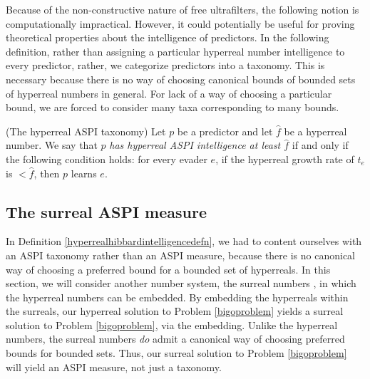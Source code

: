 \documentclass[twoside,11pt]{article}
\begin{document}
Because of the non-constructive nature of free ultrafilters, the following notion
is computationally impractical. However, it could potentially be useful for
proving theoretical properties about the intelligence of predictors. In the following
definition, rather than assigning a particular hyperreal number intelligence to every
predictor, rather, we categorize predictors into a taxonomy.
This is necessary because there is no way of choosing canonical bounds
of bounded sets of hyperreal numbers in general. For lack of a way of
choosing a particular bound, we are forced to consider many taxa corresponding
to many bounds.

\begin{definition}
\label{hyperrealhibbardintelligencedefn}
    (The hyperreal ASPI taxonomy)
    Let $p$ be a predictor and let $\hat f$ be a hyperreal number.
    We say that $p$ \emph{has hyperreal ASPI intelligence at least $\hat f$}
    if and only if the following condition holds:
    for every evader $e$, if the hyperreal growth rate of $t_e$ is
    $<\hat f$, then $p$ learns $e$.
\end{definition}

\subsection{The surreal ASPI measure}

In Definition \ref{hyperrealhibbardintelligencedefn}, we had to content ourselves
with an ASPI taxonomy rather than an ASPI measure, because there is no canonical
way of choosing a preferred bound for a bounded set of hyperreals.
In this section, we will consider another number system, the surreal numbers
\citep{conway, knuth, ehrlich2012absolute}, in which the hyperreal numbers can be
embedded. By embedding the hyperreals within the surreals, our hyperreal solution
to Problem \ref{bigoproblem} yields a surreal solution to Problem \ref{bigoproblem},
via the embedding.
Unlike the hyperreal numbers, the surreal numbers \emph{do} admit a
canonical way of choosing preferred bounds for bounded sets. Thus, our surreal
solution to Problem \ref{bigoproblem} will yield an ASPI measure, not just a taxonomy.
\end{document}
